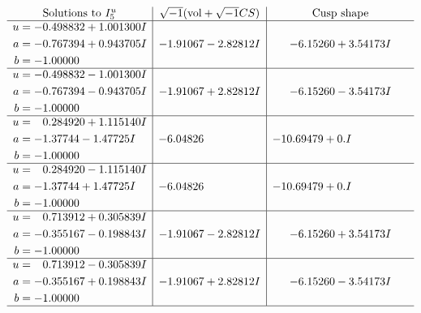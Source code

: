 \documentclass[1p]{elsarticle_modified}
\theoremstyle{definition}
\newcommand{\I}{\sqrt{-1}}
\begin{document}
$$\begin{array}{c|c|c}  
\text{Solutions to }I^u_{5}& \I (\text{vol} + \sqrt{-1}CS) & \text{Cusp shape}\\
 \hline 
\begin{aligned}
u &= -0.498832 + 1.001300 I \\
a &= -0.767394 + 0.943705 I \\
b &= -1.00000\phantom{ +0.000000I}\end{aligned}
 & -1.91067 - 2.82812 I & -6.15260 + 3.54173 I \\ \hline\begin{aligned}
u &= -0.498832 - 1.001300 I \\
a &= -0.767394 - 0.943705 I \\
b &= -1.00000\phantom{ +0.000000I}\end{aligned}
 & -1.91067 + 2.82812 I & -6.15260 - 3.54173 I \\ \hline\begin{aligned}
u &= \phantom{-}0.284920 + 1.115140 I \\
a &= -1.37744 - 1.47725 I \\
b &= -1.00000\phantom{ +0.000000I}\end{aligned}
 & -6.04826\phantom{ +0.000000I} & -10.69479 + 0. I\phantom{ +0.000000I} \\ \hline\begin{aligned}
u &= \phantom{-}0.284920 - 1.115140 I \\
a &= -1.37744 + 1.47725 I \\
b &= -1.00000\phantom{ +0.000000I}\end{aligned}
 & -6.04826\phantom{ +0.000000I} & -10.69479 + 0. I\phantom{ +0.000000I} \\ \hline\begin{aligned}
u &= \phantom{-}0.713912 + 0.305839 I \\
a &= -0.355167 - 0.198843 I \\
b &= -1.00000\phantom{ +0.000000I}\end{aligned}
 & -1.91067 - 2.82812 I & -6.15260 + 3.54173 I \\ \hline\begin{aligned}
u &= \phantom{-}0.713912 - 0.305839 I \\
a &= -0.355167 + 0.198843 I \\
b &= -1.00000\phantom{ +0.000000I}\end{aligned}
 & -1.91067 + 2.82812 I & -6.15260 - 3.54173 I\\
 \hline 
 \end{array}$$\newpage
\end{document}
